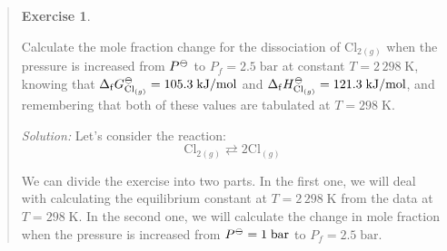 \documentclass[
  9pt,
]{extbook}
\theoremstyle{definition}
\theoremstyle{definition}
\theoremstyle{definition}
\newtheorem{exercise}{Exercise}[chapter]
\theoremstyle{definition}
\theoremstyle{remark}
\begin{document}
\begin{quote}
\begin{exercise}
\protect\hypertarget{exr:kpkx}{}\label{exr:kpkx}

Calculate the mole fraction change for the dissociation of \(\mathrm{Cl}_{2(g)}\) when the pressure is increased from \(P^{-\kern-6pt{\ominus}\kern-6pt-}\) to \(P_f=2.5 \;\text{bar}\) at constant \(T=2\,298\;\mathrm{K}\), knowing that \(\Delta_{\mathrm{f}} G^{-\kern-6pt{\ominus}\kern-6pt-}_{\mathrm{Cl}_{(g)}} = 105.3 \;\text{kJ/mol}\) and \(\Delta_{\mathrm{f}} H^{-\kern-6pt{\ominus}\kern-6pt-}_{\mathrm{Cl}_{(g)}} = 121.3 \;\text{kJ/mol}\), and remembering that both of these values are tabulated at \(T=298\;\text{K}\).

\emph{Solution:} Let's consider the reaction:
\[\mathrm{Cl}_{2(g)} \rightleftarrows 2 \mathrm{Cl}_{(g)}\]

We can divide the exercise into two parts. In the first one, we will deal with calculating the equilibrium constant at \(T=2\,298\;\mathrm{K}\) from the data at \(T=298\;\mathrm{K}\). In the second one, we will calculate the change in mole fraction when the pressure is increased from \(P^{-\kern-6pt{\ominus}\kern-6pt-}=1\;\text{bar}\) to \(P_f=2.5 \;\text{bar}\).


\end{exercise}
\end{quote}
\end{document}
